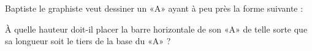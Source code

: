 
\begin{exercice}\label{exo2smath-0010}

    Baptiste le graphiste veut dessiner un «A» ayant à peu près la forme suivante :

\begin{center}
   
\end{center}

    À quelle hauteur doit-il placer la barre horizontale de son «A» de telle sorte que sa longueur soit le tiers de la base du «A» ?

\end{exercice}
